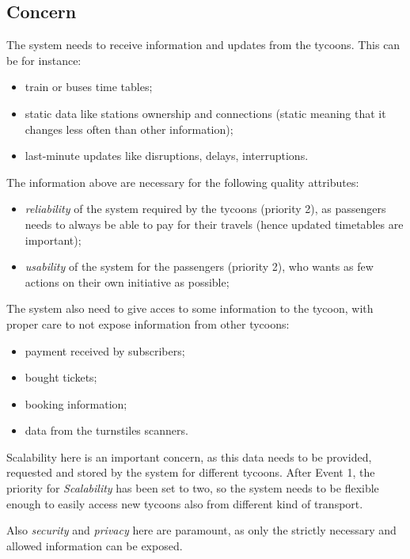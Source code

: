 \subsection*{Concern}
The system needs to receive information and updates from the tycoons. 
This can be for instance:
\begin{itemize}
    \item train or buses time tables;
    \item static data like stations ownership and connections (static meaning that it changes less often than other information);
    \item last-minute updates like disruptions, delays, interruptions.
\end{itemize}
The information above are necessary for the following quality attributes:
\begin{itemize}
    \item \textit{reliability} of the system required by the tycoons (priority 2), as passengers needs to always be able to pay for their travels (hence updated timetables are important);
    \item \textit{usability} of the system for the passengers (priority 2), who wants as few actions on their own initiative as possible;
\end{itemize}

The system also need to give acces to some information to the tycoon, with proper care to not expose information from other tycoons:
\begin{itemize}
    \item payment received by subscribers;
    \item bought tickets;
    \item booking information;
    \item data from the turnstiles scanners. 
\end{itemize}

Scalability here is an important concern, as this data needs to be provided, requested and stored by the system for different tycoons.
After Event 1, the priority for \textit{Scalability} has been set to two, so the system needs to be flexible enough to easily access new tycoons also from different kind of transport.

Also \textit{security} and \textit{privacy} here are paramount, as only the strictly necessary and allowed information can be exposed.

